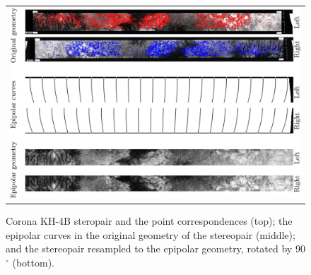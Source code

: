 \documentclass{ipol}
\begin{document}
\begin{figure}[h!]
\centering
\begin{tabular}{c}
\includegraphics[width=14cm]{FIGS/ExpCorona_lowres.png}
\end{tabular}
\caption{Corona KH-4B steropair and the point correspondences (top); the epipolar curves in the original geometry of the stereopair (middle); and the stereopair resampled to the epipolar geometry, rotated by 90$^\circ$ (bottom).}
 
\label{ExpCorona}
\end{figure}
    
    
\end{document}
